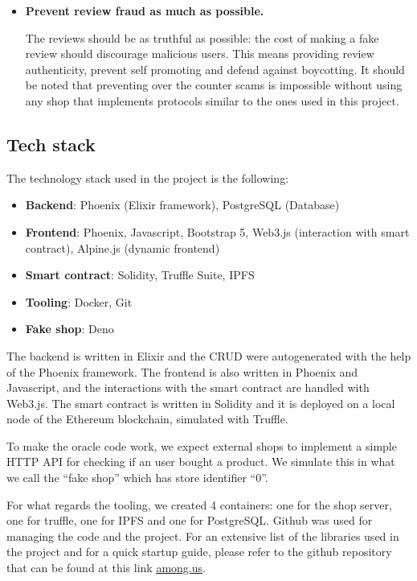 \documentclass[12pt,a4paper,oneside]{article}
\theoremstyle{definition}
\newcounter{freqcounter}
\newcounter{nfreqcounter}
\newcommand{\nreq}[1]{%
	\textbf{NFR\ref*{#1}}\refstepcounter{nfreqcounter}\label{#1}%
}
\newcommand{\ReqItemStyle}[1]{\textbf{#1}}
\newcommand{\NReqItem}[2]{\item[\nreq{#1}] \ReqItemStyle{#2}}
\begin{document}
\begin{itemize}
	\NReqItem{nreq:security}{Prevent review fraud as much as possible.}

	The reviews should be as truthful as possible: the cost of making a fake review should discourage malicious users.
	This means providing review authenticity, prevent self promoting and defend against boycotting.
	It should be noted that preventing over the counter scams is impossible without using any shop that implements protocols similar to the ones used in this project.
\end{itemize}

\subsection{Tech stack}

The technology stack used in the project is the following:
\begin{itemize}
	\item \textbf{Backend}: Phoenix (Elixir framework), PostgreSQL (Database)
	\item \textbf{Frontend}: Phoenix, Javascript, Bootstrap 5, Web3.js (interaction with smart contract), Alpine.js (dynamic frontend)
	\item \textbf{Smart contract}: Solidity, Truffle Suite, IPFS
	\item \textbf{Tooling}: Docker, Git
	\item \textbf{Fake shop}: Deno
\end{itemize}

The backend is written in Elixir and the CRUD were autogenerated with the help of the Phoenix framework. The frontend is also written in Phoenix and Javascript, and the interactions with the smart contract are handled with Web3.js. The smart contract is written in Solidity and it is deployed on a local node of the Ethereum blockchain, simulated with Truffle.

To make the oracle code work, we expect external shops to implement a simple HTTP API for checking if an user bought a product. We simulate this in what we call the ``fake shop'' which has store identifier ``0''.

For what regards the tooling, we created 4 containers: one for the shop server, one for truffle, one for IPFS and one for PostgreSQL. Github was used for managing the code and the project.
For an extensive list of the libraries used in the project and for a quick startup guide, please refer to the github repository that can be found at this link \url{among.us}.
\end{document}
